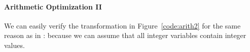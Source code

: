 


\paragraph{Arithmetic Optimization II}

We can easily verify the transformation in Figure~\ref{code:arith2}
for the same reason as in : because we can assume
that all integer variables contain integer values.

